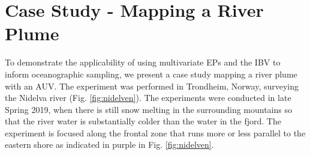 \documentclass[aoas]{imsart}
\begin{document}
\begin{table}[!h]
    \centering
      \caption{Simulation results for the final mean explained variance $\bR^{2}=100*(1-(\bSigma_{posterior}/\bSigma_{initial}))$).}
    \label{tab:sim_res_r2}
\end{table}

\newpage

\section{Case Study - Mapping a River Plume}
\label{sec:case_study}

To demonstrate the applicability of using multivariate EPs and the IBV to inform oceanographic sampling, we present a case study mapping a river plume with an AUV. The experiment was performed in Trondheim, Norway,
surveying the Nidelva river (Fig. \ref{fig:nidelven}). The experiments were conducted in late Spring 2019, when there is still snow melting in the surrounding mountains so that the river water is substantially colder than the water in the fjord. The experiment is focused along the frontal zone that runs more or less parallel to the eastern shore as
indicated in purple in Fig. \ref{fig:nidelven}. 
\end{document}
